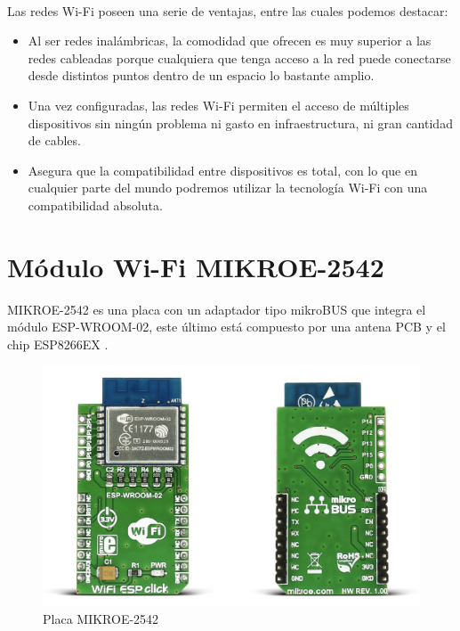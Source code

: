 \paragraph{}
Las redes Wi-Fi poseen una serie de ventajas, entre las cuales podemos destacar:
\begin{itemize}
	\item Al ser redes inalámbricas, la comodidad que ofrecen es muy superior a las redes cableadas porque cualquiera que tenga acceso a la red puede conectarse desde distintos puntos dentro de un espacio lo bastante amplio.
    \item Una vez configuradas, las redes Wi-Fi permiten el acceso de múltiples dispositivos sin ningún problema ni gasto en infraestructura, ni gran cantidad de cables.
    \item Asegura que la compatibilidad entre dispositivos es total, con lo que en cualquier parte del mundo podremos utilizar la tecnología Wi-Fi con una compatibilidad absoluta. 
\end{itemize}
 
 
 
\section{Módulo Wi-Fi MIKROE-2542}

MIKROE-2542 es una placa con un adaptador tipo mikroBUS que integra el módulo ESP-WROOM-02, este último está compuesto por una antena PCB y el chip ESP8266EX \citep{MarcoTeorico5}.

\begin{figure}[H]
	\centering
	\includegraphics[scale=.25]{Capitulo2/images/mikroe.png}
	\caption{Placa MIKROE-2542}
	\label{fig:diagrama_dispensador}
\end{figure}
